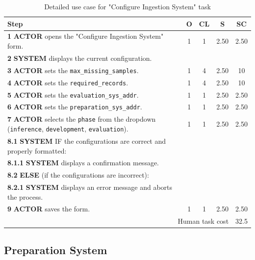 \begin{table}[H]
    \centering
    \begin{tabularx}{\textwidth}{|X|c|c|c|c|}
    \hline
    \textbf{Step} & \textbf{O} & \textbf{CL} & \textbf{S} & \textbf{SC} \\
    \hline
    \textbf{1} \textbf{ACTOR} opens the "Configure Ingestion System" form. & 1 & 1  & 2.50 & 2.50 \\
    \hline
    \textbf{2} \textbf{SYSTEM} displays the current configuration. &  & &&  \\
    \hline
    \textbf{3} \textbf{ACTOR} sets the \texttt{max\_missing\_samples}. & 1 & 4  & 2.50 & 10 \\
    \hline
    \textbf{4} \textbf{ACTOR} sets the \texttt{required\_records}. & 1 & 4 & 2.50 & 10 \\
    \hline
    \textbf{5} \textbf{ACTOR} sets the \texttt{evaluation\_sys\_addr}. & 1 & 1  & 2.50 & 2.50 \\
    \hline
    \textbf{6} \textbf{ACTOR} sets the \texttt{preparation\_sys\_addr}. & 1 & 1  & 2.50 & 2.50 \\
    \hline
    \textbf{7} \textbf{ACTOR} selects the \texttt{phase} from the dropdown (\texttt{inference}, \texttt{development}, \texttt{evaluation}). & 1 & 1  & 2.50 & 2.50 \\
    \hline
    \textbf{8.1} \textbf{SYSTEM} IF the configurations are correct and properly formatted: &  &  &  &  \\
    \hline
    \textbf{8.1.1} \textbf{SYSTEM} displays a confirmation message. &  &  &  &  \\
    \hline
    \textbf{8.2} \textbf{ELSE} (if the configurations are incorrect): &  &  &  &  \\
    \hline
    \textbf{8.2.1} \textbf{SYSTEM} displays an error message and aborts the process. &  &  &  &  \\
    \hline
    \textbf{9} \textbf{ACTOR} saves the form. & 1 & 1  & 2.50 & 2.50 \\
    \hline
    \multicolumn{4}{|r|}{Human task cost} & 32.5 \\
    \hline
    \end{tabularx}
    \caption{Detailed use case for "Configure Ingestion System" task}
    \label{table:configure_ingestion_system}
\end{table} 

\subsection{Preparation System}

